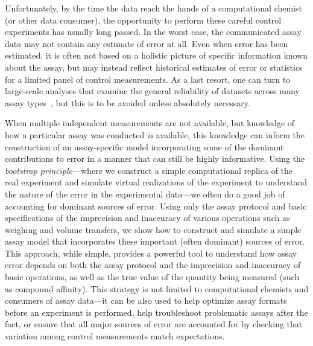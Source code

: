 \documentclass[aps,pre,twocolumn,nofootinbib,superscriptaddress,linenumbers]{revtex4-1}
\begin{document}
Unfortunately, by the time the data reach the hands of a computational chemist (or other data consumer), the opportunity to perform these careful control experiments has usually long passed.
In the worst case, the communicated assay data may not contain any estimate of error at all.
Even when error has been estimated, it is often not based on a holistic picture of specific information known about the assay, but may instead reflect historical estimates of error or statistics for a limited panel of control measurements.
As a last resort, one can turn to large-scale analyses that examine the general reliability of datasets across many assay types~\cite{kramer_experimental_2012,kalliokoski_comparability_2013}, but this is to be avoided unless absolutely necessary.

When multiple independent measurements are not available, but knowledge of how a particular assay was conducted \emph{is} available, this knowledge can inform the construction of an assay-specific model incorporating some of the dominant contributions to error in a manner that can still be highly informative.
Using the \emph{bootstrap principle}---where we construct a simple computational replica of the real experiment and simulate virtual realizations of the experiment to understand the nature of the error in the experimental data---we often do a good job of accounting for dominant sources of error.
Using only the assay protocol and basic specifications of the imprecision and inaccuracy of various operations such as weighing and volume transfers, we show how to construct and simulate a simple assay model that incorporates these important (often dominant) sources of error. 
This approach, while simple, provides a powerful tool to understand how assay error depends on both the assay protocol and the imprecision and inaccuracy of basic operations, as well as the true value of the quantity being measured (such as compound affinity). 
This strategy is not limited to computational chemists and consumers of assay data---it can be also used to help optimize assay formats before an experiment is performed, help troubleshoot problematic assays after the fact, or ensure that all major sources of error are accounted for by checking that variation among control measurements match expectations.
\end{document}
